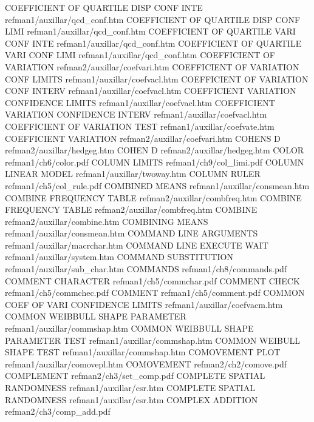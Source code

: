 COEFFICIENT OF QUARTILE DISP CONF INTE  refman1/auxillar/qcd_conf.htm
COEFFICIENT OF QUARTILE DISP CONF LIMI  refman1/auxillar/qcd_conf.htm
COEFFICIENT OF QUARTILE VARI CONF INTE  refman1/auxillar/qcd_conf.htm
COEFFICIENT OF QUARTILE VARI CONF LIMI  refman1/auxillar/qcd_conf.htm
COEFFICIENT OF VARIATION                refman2/auxillar/coefvari.htm
COEFFICIENT OF VARIATION CONF LIMITS    refman1/auxillar/coefvacl.htm
COEFFICIENT OF VARIATION CONF INTERV    refman1/auxillar/coefvacl.htm
COEFFICIENT VARIATION CONFIDENCE LIMITS refman1/auxillar/coefvacl.htm
COEFFICIENT VARIATION CONFIDENCE INTERV refman1/auxillar/coefvacl.htm
COEFFICIENT OF VARIATION TEST           refman1/auxillar/coefvate.htm
COEFFICIENT VARIATION                   refman2/auxillar/coefvari.htm
COHENS D                                refman2/auxillar/hedgeg.htm
COHEN D                                 refman2/auxillar/hedgeg.htm
COLOR                                   refman1/ch6/color.pdf
COLUMN LIMITS                           refman1/ch9/col_limi.pdf
COLUMN LINEAR MODEL                     refman1/auxillar/twoway.htm
COLUMN RULER                            refman1/ch5/col_rule.pdf
COMBINED MEANS                          refman1/auxillar/consmean.htm
COMBINE FREQUENCY TABLE                 refman2/auxillar/combfreq.htm
COMBINE FREQUENCY TABLE                 refman2/auxillar/combfreq.htm
COMBINE                                 refman2/auxillar/combine.htm
COMBINING MEANS                         refman1/auxillar/consmean.htm
COMMAND LINE ARGUMENTS                  refman1/auxillar/macrchar.htm
COMMAND LINE EXECUTE WAIT               refman1/auxillar/system.htm
COMMAND SUBSTITUTION                    refman1/auxillar/sub_char.htm
COMMANDS                                refman1/ch8/commands.pdf
COMMENT CHARACTER                       refman1/ch5/commchar.pdf
COMMENT CHECK                           refman1/ch5/commchec.pdf
COMMENT                                 refman1/ch5/comment.pdf
COMMON COEF OF VARI CONFIDENCE LIMITS   refman1/auxillar/coefvacm.htm
COMMON WEIBBULL SHAPE PARAMETER         refman1/auxillar/commshap.htm
COMMON WEIBBULL SHAPE PARAMETER TEST    refman1/auxillar/commshap.htm
COMMON WEIBULL SHAPE TEST               refman1/auxillar/commshap.htm
COMOVEMENT PLOT                         refman1/auxillar/comovepl.htm
COMOVEMENT                              refman2/ch2/comove.pdf
COMPLEMENT                              refman2/ch3/set_comp.pdf
COMPLETE SPATIAL RANDOMNESS             refman1/auxillar/csr.htm
COMPLETE SPATIAL RANDOMNESS             refman1/auxillar/csr.htm
COMPLEX ADDITION                        refman2/ch3/comp_add.pdf
